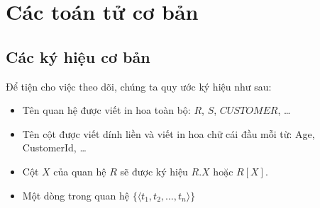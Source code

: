 \documentclass[11pt]{beamer}
\begin{document}
  \section{Các toán tử cơ bản}
  \subsection{Các ký hiệu cơ bản}
  \begin{frame}
    Để tiện cho việc theo dõi, chúng ta quy ước ký hiệu như sau:
    \begin{itemize}
      \item Tên quan hệ được viết in hoa toàn bộ: $R$, $S$, $CUSTOMER$, \dots 
      \item Tên cột được viết dính liền và viết in hoa chữ cái đầu mỗi từ: Age, CustomerId, \dots
      \item Cột $X$ của quan hệ $R$ sẽ được ký hiệu $R.X$ hoặc $R[X]$.
      \item Một dòng trong quan hệ $\{\langle t_1, t_2, \dots, t_n\rangle\}$
    \end{itemize}
  \end{frame}
\end{document}
